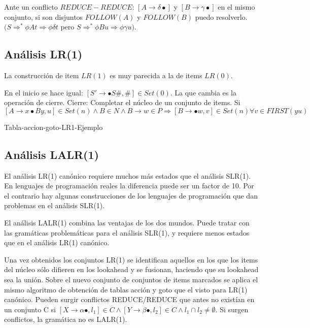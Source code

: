 Ante un conflicto $REDUCE-REDUCE$: $[A\rightarrow\delta\bullet ]$ y $[B\rightarrow\gamma\bullet ]$ en el mismo conjunto, si son disjuntos $FOLLOW(A)$ y $FOLLOW(B)$ puedo resolverlo.$(S \Rightarrow^{*}\phi At \Rightarrow\phi\delta t$ pero $S \Rightarrow^*\phi Bu \Rightarrow\phi\gamma u)$.

\subsection{Análisis LR(1)}

La construcción de item $LR(1)$ es muy parecida a la de items $LR(0)$.

En el inicio se hace igual:
$[S'\rightarrow \bullet S\#,\#]\in Set(0)$.
La que cambia es la operación de cierre.
Cierre: Completar el núcleo de un conjunto de items.
Si $[A \rightarrow x\bullet By, u]\in Set(n) \wedge B\in N\wedge B\rightarrow w \in P \Rightarrow[B \rightarrow\bullet w,v]\in Set(n) \forall v \in FIRST(yu)$

Tabla-accion-goto-LR1-Ejemplo

\subsection{Análisis LALR(1)}

El análisis LR(1) canónico requiere muchos más estados que el análisis SLR(1). En lenguajes de programación reales la diferencia puede ser un factor de 10. Por el contrario hay algunas construcciones de los lenguajes de programación que dan problemas en el análisis SLR(1).

El análisis LALR(1) combina las ventajas de los dos mundos. Puede tratar con las gramáticas problemáticas para el análisis SLR(1), y requiere menos estados que en el análisis LR(1) canónico.

Una vez obtenidos los conjuntos LR(1) se identifican aquellos en los que los items del núcleo sólo difieren en los lookahead y se fusionan, haciendo que su lookahead sea la unión.
Sobre el nuevo conjunto de conjuntos de items marcados se aplica el mismo algoritmo de obtención de tablas acción y goto que el visto para LR(1) canónico.
Pueden surgir conflictos REDUCE/REDUCE que antes no existían en un conjunto C si
$ [X\rightarrow \alpha\bullet ,l_{1} ]\in C \wedge [Y\rightarrow\beta\bullet ,l_{2}]\in C \wedge l_{1}\cap  l_{2}\neq\emptyset$.
Si surgen conflictos, la gramática no es LALR(1).

